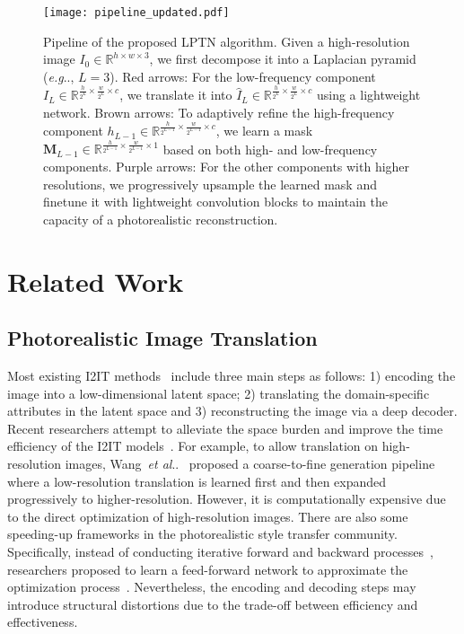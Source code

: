\documentclass[10pt,twocolumn,letterpaper]{article}
\makeatletter
\DeclareRobustCommand\onedot{\futurelet\@let@token\@onedot}
\def\@onedot{\ifx\@let@token.\else.\null\fi\xspace}
\def\eg{\emph{e.g}\onedot} \def\Eg{\emph{E.g}\onedot}
\def\etal{\emph{et al}\onedot}
\makeatother
\begin{document}
	\begin{figure*}[t]
		\centering
		\texttt{[image: pipeline\_updated.pdf]}
		\caption{Pipeline of the proposed LPTN algorithm.
Given a high-resolution image $ I_0\in\mathbb{R}^{h\times w\times 3}$, we first decompose it into a Laplacian pyramid (\eg, $L=3$). \textcolor[rgb]{1,0,0}{Red} arrows: For the low-frequency component $I_L\in\mathbb{R}^{\frac{h}{2^{L}}\times \frac{w}{2^{L}}\times c}$, we translate it into $\hat{I}_L\in\mathbb{R}^{\frac{h}{2^{L}}\times \frac{w}{2^{L}}\times c}$ using a lightweight network. \textcolor[rgb]{0.96,0.64,0.39}{Brown} arrows: To adaptively refine the high-frequency component $h_{L-1} \in \mathbb{R}^{\frac{h}{2^{L-1}}\times \frac{w}{2^{L-1}}\times c}$, we learn a mask $\bm{M}_{L-1}\in\mathbb{R}^{\frac{h}{2^{L-1}}\times \frac{w}{2^{L-1}}\times 1}$ based on both high- and low-frequency components. \textcolor[rgb]{0.5,0,0.5}{Purple} arrows: For the other components with higher resolutions, we progressively upsample the learned mask and finetune it with lightweight convolution blocks to maintain the capacity of a photorealistic reconstruction.
			\label{pipeline}}
	\end{figure*}

	\section{Related Work}
	
	\subsection{Photorealistic Image Translation}
	
	Most existing I2IT methods~\cite{isola2017image, gonzalez2018image, lee2018diverse, zhu2017unpaired, liu2017unsupervised, zhu2017toward} include three main steps as follows: 1) encoding the image into a low-dimensional latent space; 2) translating the domain-specific attributes in the latent space and 3) reconstructing the image via a deep decoder. Recent researchers attempt to alleviate the space burden and improve the time efficiency of the I2IT models~\cite{johnson2016perceptual, gharbi2017deep, zhang2017real, huang2017real, chen2017coherent, li2019learning, wang2018high}. For example, to allow translation on high-resolution images, Wang~\etal~\cite{wang2018high} proposed a coarse-to-fine generation pipeline where a low-resolution translation is learned first and then expanded progressively to higher-resolution. However, it is computationally expensive due to the direct optimization of high-resolution images. There are also some speeding-up frameworks in the photorealistic style transfer community. Specifically, instead of conducting iterative forward and backward processes~\cite{gatys2016image}, researchers proposed to learn a feed-forward network to approximate the optimization process~\cite{johnson2016perceptual,chen2017coherent,huang2017real}. Nevertheless, the encoding and decoding steps may introduce structural distortions due to the trade-off between efficiency and effectiveness.
	
\end{document}
